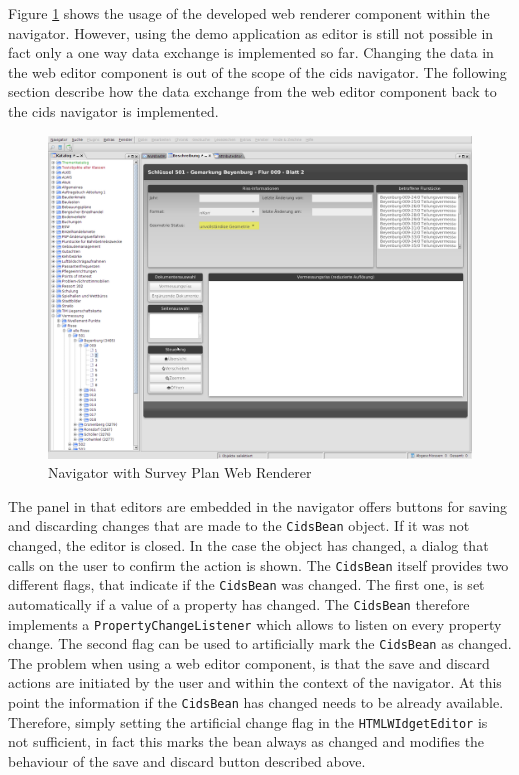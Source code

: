 Figure \ref{fig:nav_web_renderer} shows the usage of the developed web renderer component within the navigator.
However, using the demo application as editor is still not possible in fact only a one way data exchange is implemented so far. 
Changing the data in the web editor component is out of the scope of the cids navigator. 
The following section describe how the data exchange from the web editor component back to the cids navigator is implemented.

\begin{figure}
	\centering	\includegraphics[width=1.0\textwidth]{./img/impl/navigator_web_renderer.png}
	\caption{Navigator with Survey Plan Web Renderer}
	\label{fig:nav_web_renderer}
\end{figure}

The panel in that editors are embedded in the navigator offers buttons for saving and discarding changes that are made to the \texttt{CidsBean} object.
If it was not changed, the editor is closed.
In the case the object has changed, a dialog that calls on the user to confirm the action is shown.
The \texttt{CidsBean} itself provides two different flags, that indicate if the \texttt{CidsBean} was changed.
The first one, is set automatically if a value of a property has changed.
The \texttt{CidsBean} therefore implements a \texttt{PropertyChangeListener} which allows to listen on every property change.
The second flag can be used to artificially mark the \texttt{CidsBean} as changed.
The problem when using a web editor component, is that the save and discard actions are initiated by the user and within the context of the navigator.
At this point the information if the \texttt{CidsBean} has changed needs to be already available.
Therefore, simply setting the artificial change flag in the \texttt{HTMLWIdgetEditor} is not sufficient, in fact this marks the bean always as changed and modifies the behaviour of the save and discard button described above.
 
